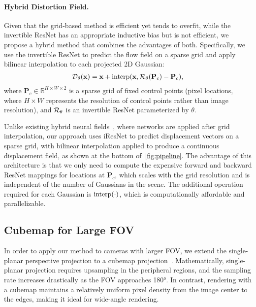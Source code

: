 \paragraph{Hybrid Distortion Field.}
Given that the grid-based method is efficient yet tends to overfit, while the invertible ResNet has an appropriate inductive bias but is not efficient, we propose a hybrid method that combines the advantages of both.
Specifically, we use the invertible ResNet to predict the flow field on a sparse grid and apply bilinear interpolation to each projected 2D Gaussian:
\begin{align}
\label{eq:hybrid_field}
    \mathcal{D}_\theta(\textbf{x}) = \textbf{x} + \operatorname{interp}(\textbf{x}, \mathcal{R}_\theta(\textbf{P}_c) - \textbf{P}_c),
\end{align}
where $\textbf{P}_c\in \mathbb{R}^{H\times W\times 2}$ is a sparse grid of fixed control points (pixel locations, where $H\times W$ represents the resolution of control points rather than image resolution), and $\mathcal{R}_\theta$ is an invertible ResNet parameterized by $\theta$. 

Unlike existing hybrid neural fields~\cite{muller2022instant}, where networks are applied after grid interpolation, our approach uses iResNet to predict displacement vectors on a sparse grid, with bilinear interpolation applied to produce a continuous displacement field, as shown at the bottom of~\cref{fig:pipeline}. 
The advantage of this architecture is that we only need to compute the expensive forward and backward ResNet mappings for locations at $\textbf{P}_c$, which scales with the grid resolution and is independent of the number of Gaussians in the scene.
The additional operation required for each Gaussian is $\operatorname{interp}(\cdot)$, which is computationally affordable and parallelizable.



\subsection{Cubemap for Large FOV}
\label{sec:cubemap}
In order to apply our method to cameras with larger FOV, we extend the single-planar perspective projection to a cubemap projection~\cite{wan2007isocube,jiang2021cubemap}. Mathematically, single-planar projection requires upsampling in the peripheral regions, and the sampling rate increases drastically as the FOV approaches 180\si{\degree}. In contrast, rendering with a cubemap maintains a relatively uniform pixel density from the image center to the edges, making it ideal for wide-angle rendering.

